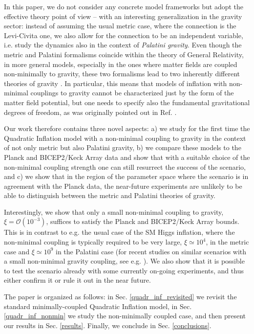 \documentclass[11pt,a4paper]{article}
\begin{document}
In this paper, we do not consider any concrete model frameworks but adopt the effective theory point of view -- with an interesting generalization in the gravity sector: instead of assuming the usual metric case, where the connection is the Levi-Civita one, we also allow for the connection to be an independent variable, i.e. study the dynamics also in the context of {\it Palatini gravity}. Even though the metric and Palatini formalisms coincide within the theory of General Relativity, in more general models, especially in the ones where matter fields are coupled non-minimally to gravity, these two formalisms lead to two inherently different theories of gravity \cite{Sotiriou:2008rp}. In particular, this means that models of inflation with non-minimal couplings to gravity cannot be characterized just by the form of the matter field potential, but one needs to specify also the fundamental gravitational degrees of freedom, as was originally pointed out in Ref. \cite{Bauer:2008zj}.

Our work therefore contains three novel aspects: a) we study for the first time the Quadratic Inflation model with a non-minimal coupling to gravity in the context of not only metric but also Palatini gravity, b) we compare these models to the Planck and BICEP2/Keck Array data and show that with a suitable choice of the non-minimal coupling strength one can still resurrect the success of the scenario, and c) we show that in the region of the parameter space where the scenario is in agreement with the Planck data, the near-future experiments are unlikely to be able to distinguish between the metric and Palatini theories of gravity. 

Interestingly, we show that only a small non-minimal coupling to gravity, $\xi=\mathcal{O}(10^{-3})$, suffices to satisfy the Planck and BICEP2/Keck Array bounds. This is in contrast to e.g. the usual case of the SM Higgs inflation, where the non-minimal coupling is typically required to be very large, $\xi\simeq 10^4$, in the metric case and $\xi\simeq 10^9$ in the Palatini case (for recent studies on similar scenarios with a small non-minimal gravity coupling, see e.g. \cite{Tenkanen:2016twd,Alanne:2016mpa}). We also show that it is possible to test the scenario already with some currently on-going experiments, and thus either confirm it or rule it out in the near future.

The paper is organized as follows: in Sec. \ref{quadr_inf_revisited} we revisit the standard minimally-coupled Quadratic Inflation model, in Sec. \ref{quadr_inf_nonmin} we study the non-minimally coupled case, and then present our results in Sec. \ref{results}. Finally, we conclude in Sec. \ref{conclusions}.
\end{document}
